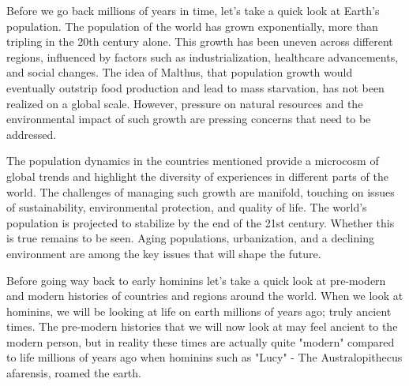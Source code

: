 \documentclass[a4paper,12pt]{book}
\newcommand{\inputtoc}[1]{}
\begin{document}
\let\oldsection\section
\renewcommand{\section}[1]{\oldsection*{#1}\addcontentsline{toc}{section}{#1}}



Before we go back millions of years in time, let's take a quick look at Earth's population. The population of the world has grown exponentially, more than tripling in the 20th century alone. This growth has been uneven across different regions, influenced by factors such as industrialization, healthcare advancements, and social changes. The idea of Malthus, that population growth would eventually outstrip food production and lead to mass starvation, has not been realized on a global scale. However, pressure on natural resources and the environmental impact of such growth are pressing concerns that need to be addressed.

\inputtoc{england.tex}
\inputtoc{germany.tex}
\inputtoc{turkey.tex}
\inputtoc{SouthAfrica.tex}
\inputtoc{brazil.tex}
\inputtoc{russia.tex}
\inputtoc{australia.tex}
\inputtoc{korea.tex}
\inputtoc{japan.tex}
\inputtoc{indonesia.tex}
\inputtoc{india.tex}
\inputtoc{china.tex}
\inputtoc{mexico.tex}
\inputtoc{canada.tex}
\inputtoc{usa.tex}

\let\section\oldsection

The population dynamics in the countries mentioned provide a microcosm of global trends and highlight the diversity of experiences in different parts of the world. The challenges of managing such growth are manifold, touching on issues of sustainability, environmental protection, and quality of life.  The world's population is projected to stabilize by the end of the 21st century. Whether this is true remains to be seen. Aging populations, urbanization, and a declining environment are among the key issues that will shape the future. 

Before going way back to early hominins let's take a quick look at pre-modern and modern histories of countries and regions around the world. When we look at hominins, we will be looking at life on earth millions of years ago; truly ancient times. The pre-modern histories that we will now look at may feel ancient to the modern person, but in reality these times are actually quite "modern" compared to life millions of years ago when hominins such as "Lucy" - The Australopithecus afarensis, roamed the earth. 
\end{document}

